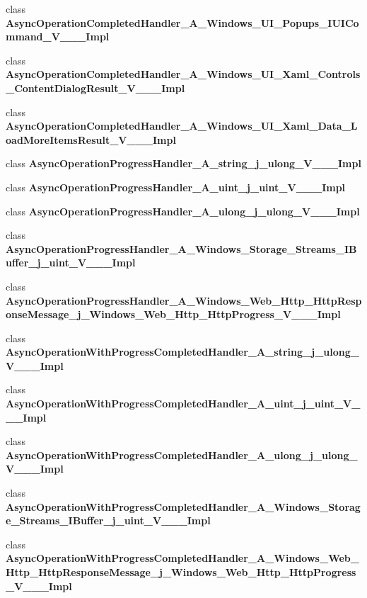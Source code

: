 \begin{DoxyCompactItemize}
\item 
class {\bfseries Async\+Operation\+Completed\+Handler\+\_\+\+A\+\_\+\+Windows\+\_\+\+U\+I\+\_\+\+Popups\+\_\+\+I\+U\+I\+Command\+\_\+\+V\+\_\+\+\_\+\+\_\+\+Impl}
\item 
class {\bfseries Async\+Operation\+Completed\+Handler\+\_\+\+A\+\_\+\+Windows\+\_\+\+U\+I\+\_\+\+Xaml\+\_\+\+Controls\+\_\+\+Content\+Dialog\+Result\+\_\+\+V\+\_\+\+\_\+\+\_\+\+Impl}
\item 
class {\bfseries Async\+Operation\+Completed\+Handler\+\_\+\+A\+\_\+\+Windows\+\_\+\+U\+I\+\_\+\+Xaml\+\_\+\+Data\+\_\+\+Load\+More\+Items\+Result\+\_\+\+V\+\_\+\+\_\+\+\_\+\+Impl}
\item 
class {\bfseries Async\+Operation\+Progress\+Handler\+\_\+\+A\+\_\+string\+\_\+j\+\_\+ulong\+\_\+\+V\+\_\+\+\_\+\+\_\+\+Impl}
\item 
class {\bfseries Async\+Operation\+Progress\+Handler\+\_\+\+A\+\_\+uint\+\_\+j\+\_\+uint\+\_\+\+V\+\_\+\+\_\+\+\_\+\+Impl}
\item 
class {\bfseries Async\+Operation\+Progress\+Handler\+\_\+\+A\+\_\+ulong\+\_\+j\+\_\+ulong\+\_\+\+V\+\_\+\+\_\+\+\_\+\+Impl}
\item 
class {\bfseries Async\+Operation\+Progress\+Handler\+\_\+\+A\+\_\+\+Windows\+\_\+\+Storage\+\_\+\+Streams\+\_\+\+I\+Buffer\+\_\+j\+\_\+uint\+\_\+\+V\+\_\+\+\_\+\+\_\+\+Impl}
\item 
class {\bfseries Async\+Operation\+Progress\+Handler\+\_\+\+A\+\_\+\+Windows\+\_\+\+Web\+\_\+\+Http\+\_\+\+Http\+Response\+Message\+\_\+j\+\_\+\+Windows\+\_\+\+Web\+\_\+\+Http\+\_\+\+Http\+Progress\+\_\+\+V\+\_\+\+\_\+\+\_\+\+Impl}
\item 
class {\bfseries Async\+Operation\+With\+Progress\+Completed\+Handler\+\_\+\+A\+\_\+string\+\_\+j\+\_\+ulong\+\_\+\+V\+\_\+\+\_\+\+\_\+\+Impl}
\item 
class {\bfseries Async\+Operation\+With\+Progress\+Completed\+Handler\+\_\+\+A\+\_\+uint\+\_\+j\+\_\+uint\+\_\+\+V\+\_\+\+\_\+\+\_\+\+Impl}
\item 
class {\bfseries Async\+Operation\+With\+Progress\+Completed\+Handler\+\_\+\+A\+\_\+ulong\+\_\+j\+\_\+ulong\+\_\+\+V\+\_\+\+\_\+\+\_\+\+Impl}
\item 
class {\bfseries Async\+Operation\+With\+Progress\+Completed\+Handler\+\_\+\+A\+\_\+\+Windows\+\_\+\+Storage\+\_\+\+Streams\+\_\+\+I\+Buffer\+\_\+j\+\_\+uint\+\_\+\+V\+\_\+\+\_\+\+\_\+\+Impl}
\item 
class {\bfseries Async\+Operation\+With\+Progress\+Completed\+Handler\+\_\+\+A\+\_\+\+Windows\+\_\+\+Web\+\_\+\+Http\+\_\+\+Http\+Response\+Message\+\_\+j\+\_\+\+Windows\+\_\+\+Web\+\_\+\+Http\+\_\+\+Http\+Progress\+\_\+\+V\+\_\+\+\_\+\+\_\+\+Impl}

\end{DoxyCompactItemize}
